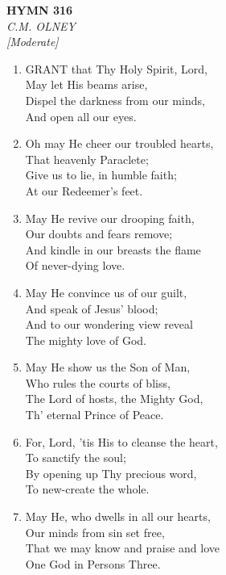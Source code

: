 \newpage
\begin{center}
    {\Large \textbf{HYMN 316}}
    \\
    \textit{C.M. OLNEY}
    \\
    \textit{\small [Moderate]}
\end{center}
\vspace{1em}

\begin{enumerate}
    \item GRANT that Thy Holy Spirit, Lord, \\
        May let His beams arise, \\
        Dispel the darkness from our minds, \\
        And open all our eyes.

    \item Oh may He cheer our troubled hearts, \\
        That heavenly Paraclete; \\
        Give us to lie, in humble faith; \\
        At our Redeemer's feet.

    \item May He revive our drooping faith, \\
        Our doubts and fears remove; \\
        And kindle in our breasts the flame \\
        Of never-dying love.

    \item May He convince us of our guilt, \\
        And speak of Jesus' blood; \\
        And to our wondering view reveal \\
        The mighty love of God.

    \item May He show us the Son of Man, \\
        Who rules the courts of bliss, \\
        The Lord of hosts, the Mighty God, \\
        Th' eternal Prince of Peace.

    \item For, Lord, 'tis His to cleanse the heart, \\
        To sanctify the soul; \\
        By opening up Thy precious word, \\
        To new-create the whole.

    \item May He, who dwells in all our hearts, \\
        Our minds from sin set free, \\
        That we may know and praise and love \\
        One God in Persons Three.

\end{enumerate}
